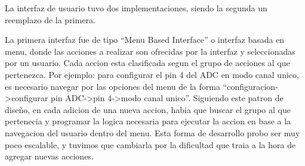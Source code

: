 
La interfaz de usuario tuvo dos implementaciones, siendo la segunda un reemplazo de la primera.

La primera interfaz fue de tipo ``Menu Based Interface'' o interfaz basada en menu, donde las acciones a realizar son ofrecidas por la interfaz y seleccionadas por un usuario. Cada accion esta clasificada segun el grupo de acciones al que pertenezca. Por ejemplo: para configurar el pin 4 del ADC en modo canal unico, es necesario navegar por las opciones del menu de la forma ``configuracion->configurar pin ADC->pin 4->modo canal unico''. Siguiendo este patron de diseño, en cada adicion de una nueva accion, habia que buscar el grupo al que pertenecia y programar la logica necesaria para ejecutar la accion en base a la navegacion del usuario dentro del menu. Esta forma de desarrollo probo ser muy poco escalable, y tuvimos que cambiarla por la dificultad que traia a la hora de agregar nuevas acciones. \\

